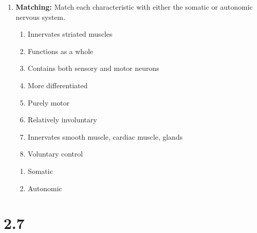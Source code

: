 \begin{enumerate}[label=\textbf{Q2.6.\arabic*}]
      \item \textbf{Matching:} Match each characteristic with either the somatic or autonomic nervous system.
            \begin{wordbox}
                  \begin{enumerate}[label=(\alph*)]
                        \item Innervates striated muscles
                        \item Functions as a whole
                        \item Contains both sensory and motor neurons
                        \item More differentiated
                        \item Purely motor
                        \item Relatively involuntary
                        \item Innervates smooth muscle, cardiac muscle, glands
                        \item Voluntary control
                  \end{enumerate}
            \end{wordbox}
            \begin{enumerate}[label=(\arabic*)]
                  \item Somatic \quad \dotfill \quad \underline{\hspace{3cm}} \\
                  \item Autonomic \quad \dotfill \quad \underline{\hspace{3cm}}
            \end{enumerate}
\end{enumerate}
\squigglyline


\section*{2.7}

